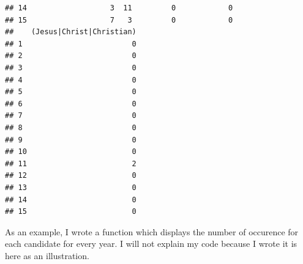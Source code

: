 \documentclass{llncs}\usepackage[]{graphicx}\usepackage[]{color}
\makeatletter
\newenvironment{kframe}{%
 \def\at@end@of@kframe{}%
 \ifinner\ifhmode%
  \def\at@end@of@kframe{\end{minipage}}%
  \begin{minipage}{\columnwidth}%
 \fi\fi%
 \def\FrameCommand##1{\hskip\@totalleftmargin \hskip-\fboxsep
 \colorbox{shadecolor}{##1}\hskip-\fboxsep
     \hskip-\linewidth \hskip-\@totalleftmargin \hskip\columnwidth}%
 \MakeFramed {\advance\hsize-\width
   \@totalleftmargin\z@ \linewidth\hsize
   \@setminipage}}%
 {\par\unskip\endMakeFramed%
 \at@end@of@kframe}
\newenvironment{knitrout}{}{} %
\makeatother
\begin{document}
\begin{knitrout}
\begin{kframe}
\begin{lstlisting}[basicstyle=\ttfamily,breaklines=true]
## 14                   3  11         0            0
## 15                   7   3         0            0
##    (Jesus|Christ|Christian)
## 1                         0
## 2                         0
## 3                         0
## 4                         0
## 5                         0
## 6                         0
## 7                         0
## 8                         0
## 9                         0
## 10                        0
## 11                        2
## 12                        0
## 13                        0
## 14                        0
## 15                        0
\end{lstlisting}
\end{kframe}
\end{knitrout}
\noindent
As an example, I wrote a function which displays the number of occurence for each candidate for every year. I will not explain my code because I wrote it is here as an illustration.
\end{document}

